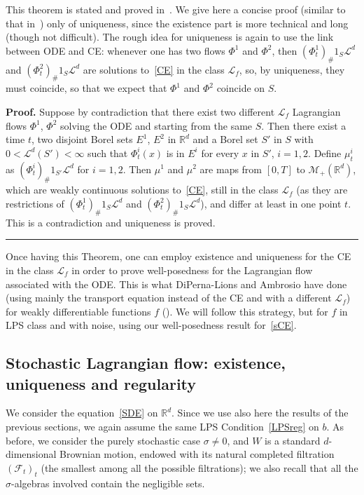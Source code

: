 \documentclass[a4paper,10pt]{article}
\newenvironment{proof}[1][Proof]{\noindent\textbf{#1.} }{\ \rule{0.5em}{0.5em}}
\newcommand{\mr}{\mathbb{R}}
\newcommand{\mc}{\mathcal}
\begin{document}
This theorem is stated and proved in~\cite[Theorem 18]{AMBCRI08}. We give here a concise proof (similar to that in~\cite{AMBCRI08}) only of uniqueness, since the existence part is more technical and long (though not difficult). The rough idea for uniqueness is again to use the link between ODE and CE: whenever one has two flows $\Phi^1$ and $\Phi^2$, then $(\Phi^1_t)_\#1_S \mc{L}^d$ and $(\Phi^2_t)_\#1_S \mc{L}^d$ are solutions to~\eqref{CE} in the class $\mc{L}_f$, so, by uniqueness, they must coincide, so that we expect that $\Phi^1$ and $\Phi^2$ coincide on $S$.

\begin{proof}
Suppose by contradiction that there exist two different $\mc{L}_f$ Lagrangian flows $\Phi^1$, $\Phi^2$ solving the ODE and starting from the same $S$. Then there exist a time $t$, two disjoint Borel sets $E^1$, $E^2$ in $\mr^d$ and a Borel set $S'$ in $S$ with $0<\mc{L}^d(S')<\infty$ such that $\Phi_t^i(x)$ is in $E^i$ for every $x$ in $S'$, $i=1,2$. Define $\mu^i_t$ as $(\Phi^i_t)_\#1_{S'} \mc{L}^d$ for $i=1,2$. Then $\mu^1$ and $\mu^2$ are maps from $[0,T]$ to $\mc{M}_+(\mr^d)$, which are weakly continuous solutions to~\eqref{CE}, still in the class $\mc{L}_f$ (as they are restrictions of $(\Phi^1_t)_\#1_S \mc{L}^d$ and $(\Phi^2_t)_\#1_S \mc{L}^d$), and differ at least in one point $t$. This is a contradiction and uniqueness is proved.
\end{proof}

Once having this Theorem, one can employ existence and uniqueness for the CE in the class $\mc{L}_f$ in order to prove well-posedness for the Lagrangian flow associated with the ODE. This is what DiPerna-Lions and Ambrosio have done (using mainly the transport equation instead of the CE and with a different $\mc{L}_f$) for weakly differentiable functions $f$ (\cite{DIPELI89,AMBROSIO04}). We will follow this strategy, but for $f$ in LPS class and with noise, using our well-posedness result for~\eqref{sCE}.

\subsection{Stochastic Lagrangian flow: existence, uniqueness and regularity}

We consider the equation~\eqref{SDE} on $\mr^d$. Since we use also here the results of the previous sections, we again assume the same LPS Condition~\ref{LPSreg} on $b$. As before, we consider the purely stochastic case $\sigma\neq0$, and $W$ is a standard $d$-dimensional Brownian motion, endowed with its natural completed filtration $(\mc{F}_t)_t$ (the smallest among all the possible filtrations); we also recall that all the $\sigma$-algebras involved contain the negligible sets. 
\end{document}
